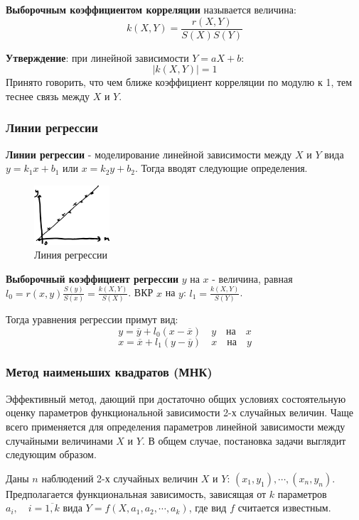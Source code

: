 \documentclass[12pt, a4paper]{article}
\begin{document}
\textbf{Выборочным коэффициентом корреляции} называется величина:
\[k(X, Y) = \frac{r(X, Y)}{S(X)S(Y)} \]

\textbf{Утверждение}: при линейной зависимости $Y = aX + b$:
\[|k(X, Y)| = 1 \]
Принято говорить, что чем ближе коэффициент корреляции по модулю к 1, тем теснее связь между $X$ и $Y$.

\subsubsection{Линии регрессии}

\textbf{Линии регрессии} - моделирование линейной зависимости между $X$ и $Y$ вида $y = k_1x + b_1$ или $x = k_2y + b_2$. Тогда вводят следующие определения.

\begin{figure}
  \centering
  \includegraphics[width=0.25\textwidth]{04}
  \vspace{-7mm}
  \caption{Линия регрессии}
\end{figure}

\textbf{Выборочный коэффициент регрессии} $y$ на $x$ - величина, равная $l_0 = r(x, y) \frac{S(y)}{S(x)} = \frac{k(X, Y)}{S(X)}$. ВКР $x$ на $y$: $l_1 = \frac{k(X, Y)}{S(Y)}$.

Тогда уравнения регрессии примут вид:
\[y = \overline{y} + l_0(x-\overline{x}) \quad y \quad \textrm{на} \quad x \]
\[x = \overline{x} + l_1(y-\overline{y}) \quad x \quad \textrm{на} \quad y \]

\subsubsection{Метод наименьших квадратов (МНК)}

Эффективный метод, дающий при достаточно общих условиях состоятельную оценку параметров функциональной зависимости 2-х случайных величин. Чаще всего применяется для определения параметров линейной зависимости между случайными величинами $X$ и $Y$. В общем случае, постановка задачи выглядит следующим образом.

Даны $n$ наблюдений 2-х случайных величин $X$ и $Y$: $(x_1, y_1), \cdots, (x_n, y_n)$. Предполагается функциональная зависимость, зависящая от $k$ параметров $a_i, \quad i = \overline{1,k}$ вида $Y = f(X, a_1, a_2, \cdots, a_k)$, где вид $f$ считается известным.
\end{document}
